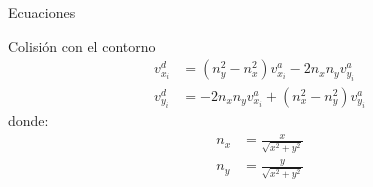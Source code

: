 \begin{frame}{Ecuaciones}

    \begin{block}{Colisión con el contorno}
        \begin{equation}
            \begin{aligned}
                v_{x_i}^{d} &= (n_y^2 - n_x^2) v_{x_i}^{a} - 2 n_x n_y v_{y_i}^{a} \\
                v_{y_i}^{d} &= -2 n_x n_y v_{x_i}^{a} + (n_x^2 - n_y^2) v_{y_i}^{a}
            \end{aligned}\label{eq:equation-particles-collision-wall}
        \end{equation}
        donde:
        \begin{equation}
            \begin{aligned}
                n_x &= \frac{x}{\sqrt{x^2 + y^2}} \\
                n_y &= \frac{y}{\sqrt{x^2 + y^2}}
            \end{aligned}\label{eq:equation-particles-collision-wall-variables}
        \end{equation}
    \end{block}


\end{frame}
